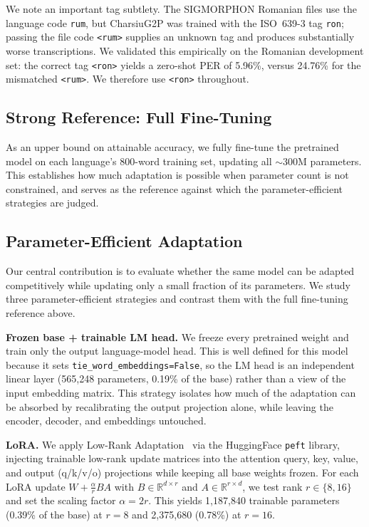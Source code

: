 \documentclass[conference]{IEEEtran}
\begin{document}
We note an important tag subtlety. The SIGMORPHON Romanian files use the language code \texttt{rum}, but CharsiuG2P was trained with the ISO~639-3 tag \texttt{ron}; passing the file code \texttt{<rum>} supplies an unknown tag and produces substantially worse transcriptions. We validated this empirically on the Romanian development set: the correct tag \texttt{<ron>} yields a zero-shot PER of 5.96\%, versus 24.76\% for the mismatched \texttt{<rum>}. We therefore use \texttt{<ron>} throughout.

\subsection{Strong Reference: Full Fine-Tuning}

As an upper bound on attainable accuracy, we fully fine-tune the pretrained model on each language's 800-word training set, updating all $\sim$300M parameters. This establishes how much adaptation is possible when parameter count is not constrained, and serves as the reference against which the parameter-efficient strategies are judged.

\subsection{Parameter-Efficient Adaptation}

Our central contribution is to evaluate whether the same model can be adapted competitively while updating only a small fraction of its parameters. We study three parameter-efficient strategies and contrast them with the full fine-tuning reference above.

\textbf{Frozen base + trainable LM head.} We freeze every pretrained weight and train only the output language-model head. This is well defined for this model because it sets \texttt{tie\_word\_embeddings=False}, so the LM head is an independent linear layer (565{,}248 parameters, 0.19\% of the base) rather than a view of the input embedding matrix. This strategy isolates how much of the adaptation can be absorbed by recalibrating the output projection alone, while leaving the encoder, decoder, and embeddings untouched.

\textbf{LoRA.} We apply Low-Rank Adaptation~\cite{hu2021} via the HuggingFace \texttt{peft} library, injecting trainable low-rank update matrices into the attention query, key, value, and output (q/k/v/o) projections while keeping all base weights frozen. For each LoRA update $W + \frac{\alpha}{r}BA$ with $B \in \mathbb{R}^{d\times r}$ and $A \in \mathbb{R}^{r\times d}$, we test rank $r \in \{8, 16\}$ and set the scaling factor $\alpha = 2r$. This yields 1{,}187{,}840 trainable parameters (0.39\% of the base) at $r{=}8$ and 2{,}375{,}680 (0.78\%) at $r{=}16$.
\end{document}
